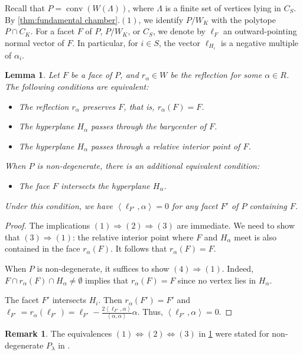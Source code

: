 \documentclass{amsart}
\theoremstyle{plain} \numberwithin{equation}{section}
\newtheorem{lemma}[theorem]{Lemma}
\theoremstyle{definition}
\newtheorem{remark}[theorem]{Remark}
\newcommand{\ip}[1]{\left\langle #1 \right\rangle}
\DeclareMathOperator{\conv}{conv}
\begin{document}
Recall that $P=\conv\left(W(\Lambda)\right)$, where $\Lambda$ is a finite set of vertices lying in  $C_S$.  By \cref{thm:fundamental chamber}.$(1)$, we identify $P/W_K$ with the polytope $P\cap C_K$.
For a facet $F$ of $P$, $P/W_K$, or $C_S$, we denote by $\ell_F$ an outward-pointing normal vector of $F$.
In particular, for $i \in S$, the vector $\ell_{H_i}$ is a negative multiple of $\alpha_i$.

\begin{lemma}\label{lemma:intersection HF}
  Let $F$ be a face of $P$, and $r_{\alpha}\in W$ be the reflection for some $\alpha\in R$. The following conditions are equivalent:
  \begin{itemize}
    \item[$(1)$] The reflection $r_{\alpha}$ preserves $F$, that is, $r_{\alpha}(F)=F$.
    \item[$(2)$] The hyperplane $H_{\alpha}$ passes through the barycenter of $F$.
    \item[$(3)$] The hyperplane $H_{\alpha}$ passes through a relative interior point of $F$.
  \end{itemize}
 When $P$ is non-degenerate, there is an additional equivalent condition:
  \begin{itemize}
    \item[$(4)$] The face $F$ intersects the hyperplane $H_{\alpha}$.
  \end{itemize}
 Under this condition, we have  $\ip{\ell_{F'},\alpha}=0$ for any facet $F'$ of $P$ containing $F$.
\end{lemma}
\begin{proof}
  The implications  $(1)\Rightarrow(2)\Rightarrow(3)$ are immediate. We need to show that $(3)\Rightarrow (1)$: the relative interior point where $F$ and $H_{\alpha}$ meet is also contained in the face $r_{\alpha}(F)$. It follows that $r_{\alpha}(F) = F$.

  When $P$ is non-degenerate, it suffices to show $(4)\Rightarrow (1)$. Indeed, $F\cap r_{\alpha}(F)\cap H_{\alpha}\ne\emptyset$ implies that $r_{\alpha}(F)=F$ since no vertex lies in $H_{\alpha}$.
  
  
  The facet $F'$ intersects $H_i$. Then $r_{\alpha}(F')=F'$ and $\ell_{F'}=r_{\alpha}(\ell_{F'})=\ell_{F'}-\frac{2\ip{\ell_{F'},\alpha}}{\ip{\alpha,\alpha}}\alpha$.
  Thus, $\ip{\ell_{F'},\alpha}=0$.
  \qedhere
\end{proof}

\begin{remark}\label{remark:Vinberg}
  The equivalences $(1)\Leftrightarrow(2)\Leftrightarrow(3)$ in \cref{lemma:intersection HF} were stated for non-degenerate $P_{\lambda}$ in \cite[\S 3]{vinbergCERTAINCOMMUTATIVESUBALGEBRAS1991}.
\end{remark}
\end{document}
